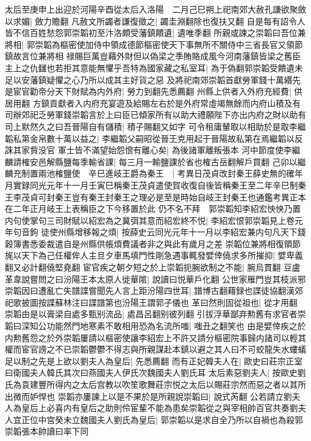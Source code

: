 太后至庚申上出迎於河陽辛酉從太后入洛陽　二月己巳朔上祀南郊大赦孔謙欲聚斂以求媚|{
	斂力贍翻}
凡赦文所蠲者謙復徵之|{
	蠲圭淵翻除也復扶又翻}
自是每有詔令人皆不信百姓愁怨郭崇韜初至汴洛頗受藩鎮饋遺|{
	遺唯季翻}
所親或諫之崇韜曰吾位兼將相|{
	郭崇韜為樞密使加侍中領成德節樞密使天下事無所不關侍中三省長官又領節鎮故言位兼將相}
禄賜巨萬豈藉外財但以偽梁之季賄賂成風今河南藩鎮皆梁之舊臣主上之仇讎也若拒其意能無懼乎吾特為國家藏之私室耳|{
	為于偽翻郭崇韜受饋遺未足以安藩鎮疑懼之心乃所以成其主好貨之惡}
及將祀南郊崇韜首獻勞軍錢十萬緡先是宦官勸帝分天下財賦為内外府|{
	勞力到翻先悉薦翻}
州縣上供者入外府充經費|{
	供居用翻}
方鎮貢獻者入内府充宴遊及給賜左右於是外府常虛竭無餘而内府山積及有司辦郊祀乏勞軍錢崇韜言於上曰臣已傾家所有以助大禮願陛下亦出内府之財以助有司上默然久之曰吾晉陽自有儲積|{
	積子賜翻又如字}
可令租庸輦取以相助於是取李繼韜私第金帛數十萬以益之|{
	李繼韜父嗣昭從晉王克用起于晉陽故私第在焉繼韜以反誅其家貲没官}
軍士皆不滿望始怨恨有離心矣|{
	為後諸軍離叛張本}
河中節度使李繼麟請榷安邑解縣鹽每季輸省課|{
	每三月一輸鹽課於省也榷古岳翻解戶買翻}
己卯以繼麟充制置兩池榷鹽使　辛巳進岐王爵為秦王　|{
	考異日茂貞改封秦王薛史無的確年月實録同光元年十一月壬寅巳稱秦王茂貞遣使賀收復自後皆稱秦王至二年辛巳制秦王李茂貞可封秦王豈有秦王封秦王之理必是至是時始自岐王封秦王也通鑑考異正本在二年正月岐王上表稱臣之下今移置於此}
仍不名不拜　郭崇韜知李紹宏怏怏乃置内句使掌句三司財賦以紹宏為之冀弭其意而紹宏終不悦|{
	李紹宏恨郭崇韜見上卷元年句音鉤}
徒使州縣增移報之煩|{
	按薛史云同光元年十一月以李紹宏兼内句凡天下錢穀簿書悉委裁遣自是州縣供帳煩費議者非之與此有歲月之差}
崇韜位兼將相復領節旄以天下為己任權侔人主旦夕車馬填門性剛急遇事輒發嬖倖僥求多所摧抑|{
	嬖卑義翻又必計翻僥堅堯翻}
宦官疾之朝夕短之於上崇韜扼腕欲制之不能|{
	腕烏貫翻}
豆盧革韋說嘗問之曰汾陽王本太原人徙華隂|{
	說讀曰悦華戶化翻}
公世家雁門豈其枝派邪崇韜因曰遭亂亡失譜諜嘗聞先人言上距汾陽四世耳|{
	譜博古翻藉録也諜徒協翻漢郊祀歌披圖按諜蘇林注曰諜譜第也汾陽王謂郭子儀也}
革曰然則固從祖也|{
	從才用翻}
崇韜由是以膏梁自處多甄别流品|{
	處昌呂翻别彼列翻}
引拔浮華鄙弃勲舊有求官者崇韜曰深知公功能然門地寒素不敢相用恐為名流所嗤|{
	嗤丑之翻笑也}
由是嬖倖疾之於内勲舊怨之於外崇韜屢請以樞密使讓李紹宏上不許又請分樞密院事歸内諸司以輕其權而宦官謗之不已崇韜鬱鬱不得志與所親謀赴本鎮以避之其人曰不可蛟龍失水螻蟻足以制之先是上欲以劉夫人為皇后|{
	先悉薦翻}
而有正妃韓夫人在|{
	歐史曰莊宗正室曰衛國夫人韓氏其次曰燕國夫人伊氏次魏國夫人劉氏耳}
太后素惡劉夫人|{
	按歐史劉氏為袁建豐所得内之太后宫教以吹笙歌舞莊宗悦之太后以賜莊宗然而惡之者以其所出微而妒悍也}
崇韜亦屢諫上以是不果於是所親說崇韜曰|{
	說式芮翻}
公若請立劉夫人為皇后上必喜内有皇后之助則伶宦輩不能為患矣崇韜從之與宰相帥百官共奏劉夫人宜正位中宫癸未立魏國夫人劉氏為皇后|{
	郭崇韜以是求自全乃所以自禍也為殺郭崇韜張本帥讀曰率下同}
